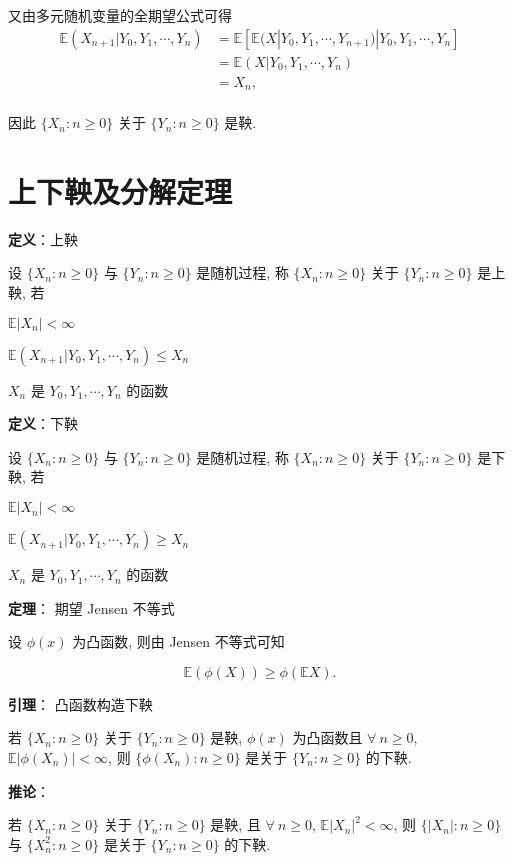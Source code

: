 \documentclass[openany]{ctexbook}
\theoremstyle{kaiti}
\theoremstyle{normal}
\begin{document}
又由多元随机变量的全期望公式可得
\begin{equation}
  \begin{aligned}
    \mathbb{E}(X_{n+1}|Y_0,Y_1,\cdots,Y_n)
    &=\mathbb{E}[\mathbb{E}(X|Y_0,Y_1,\cdots,Y_{n+1})|Y_0,Y_1,\cdots,Y_n]\\
    &=\mathbb{E}(X|Y_0,Y_1,\cdots,Y_n)\\
    &=X_n,\\
  \end{aligned}
\end{equation}

因此 $\{X_n:n\geqslant0\}$ 关于 $\{Y_n:n\geqslant0\}$ 是鞅.

\section{上下鞅及分解定理}

\textbf{定义}：上鞅

设 $\{X_n:n\geqslant0\}$ 与 $\{Y_n:n\geqslant0\}$ 是随机过程, 称 $\{X_n:n\geqslant0\}$ 关于 $\{Y_n:n\geqslant0\}$ 是上鞅, 若 

$\mathbb{E}|X_n|<\infty$

$\mathbb{E}(X_{n+1}|Y_0,Y_1,\cdots,Y_n)\leqslant X_n$

$X_n$ 是 $Y_0,Y_1,\cdots,Y_n$ 的函数

\textbf{定义}：下鞅

设 $\{X_n:n\geqslant0\}$ 与 $\{Y_n:n\geqslant0\}$ 是随机过程, 称 $\{X_n:n\geqslant0\}$ 关于 $\{Y_n:n\geqslant0\}$ 是下鞅, 若 

$\mathbb{E}|X_n|<\infty$

$\mathbb{E}(X_{n+1}|Y_0,Y_1,\cdots,Y_n)\geqslant X_n$

$X_n$ 是 $Y_0,Y_1,\cdots,Y_n$ 的函数

\textbf{定理}： 期望 Jensen 不等式

设 $\phi(x)$ 为凸函数, 则由 Jensen 不等式可知

\begin{equation}
  \mathbb{E}(\phi(X))\geqslant\phi(\mathbb{E}X).
\end{equation}

\textbf{引理}： 凸函数构造下鞅

若 $\{X_n:n\geqslant0\}$ 关于 $\{Y_n:n\geqslant0\}$ 是鞅, $\phi(x)$ 为凸函数且 $\forall~n\geqslant0$, $\mathbb{E}|\phi(X_n)|<\infty$, 则 $\{\phi(X_n):n\geqslant0\}$ 是关于 $\{Y_n:n\geqslant0\}$ 的下鞅.

\textbf{推论}：

若 $\{X_n:n\geqslant0\}$ 关于 $\{Y_n:n\geqslant0\}$ 是鞅, 且 $\forall~n\geqslant0$, $\mathbb{E}|X_n|^2<\infty$, 则 $\{|X_n|:n\geqslant0\}$ 与 $\{X_n^2:n\geqslant0\}$ 是关于 $\{Y_n:n\geqslant0\}$ 的下鞅.
\end{document}

